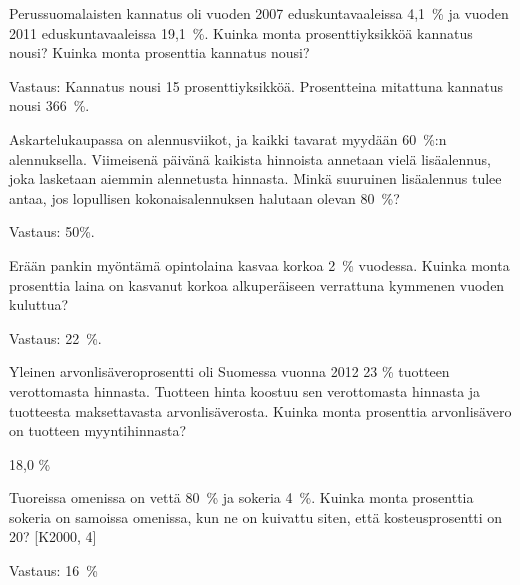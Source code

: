\begin{tehtava}
    Perussuomalaisten kannatus oli vuoden 2007 eduskuntavaaleissa 4,1~\% ja vuoden 2011 eduskuntavaaleissa 19,1~\%. Kuinka monta prosenttiyksikköä kannatus nousi? Kuinka monta prosenttia kannatus nousi?
    \begin{vastaus}
    Vastaus: Kannatus nousi 15 prosenttiyksikköä. Prosentteina mitattuna kannatus nousi 366~\%.
    \end{vastaus}
\end{tehtava}

\begin{tehtava}
    Askartelukaupassa on alennusviikot, ja kaikki tavarat myydään 60~\%:n alennuksella. Viimeisenä päivänä kaikista hinnoista annetaan vielä lisäalennus, joka lasketaan aiemmin alennetusta hinnasta. Minkä suuruinen lisäalennus tulee antaa, jos lopullisen kokonaisalennuksen halutaan olevan 80~\%?
    \begin{vastaus}
        Vastaus: 50\%.
    \end{vastaus}
\end{tehtava}

\begin{tehtava}
    Erään pankin myöntämä opintolaina kasvaa korkoa 2~\% vuodessa. Kuinka monta prosenttia laina on kasvanut korkoa alkuperäiseen verrattuna kymmenen vuoden kuluttua?
    \begin{vastaus}
        Vastaus: 22~\%.
    \end{vastaus}
\end{tehtava}

\begin{tehtava}
Yleinen arvonlisäveroprosentti oli Suomessa vuonna 2012 23 \% tuotteen verottomasta
hinnasta. Tuotteen hinta koostuu sen verottomasta hinnasta
ja tuotteesta maksettavasta arvonlisäverosta. Kuinka monta
prosenttia arvonlisävero on tuotteen myyntihinnasta?
\begin{vastaus}
18,0 \%
\end{vastaus}
\end{tehtava}


\begin{tehtava}
    Tuoreissa omenissa on vettä 80~\% ja sokeria 4~\%. Kuinka monta prosenttia sokeria on samoissa omenissa, kun ne on kuivattu siten, että kosteusprosentti on 20? [K2000, 4]
    \begin{vastaus}
        Vastaus: 16~\%
    \end{vastaus}
\end{tehtava}

